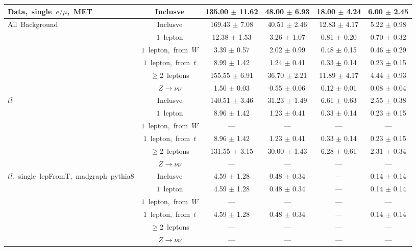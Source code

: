 \documentclass{article}
\begin{document}
\begin{longtable}{|l|c|c|c|c|c|}
\multirow{1}{*}{Data,~single~$e/\mu$,~MET} & Inclusve  & 135.00 $\pm$ 11.62  & 48.00 $\pm$ 6.93  & 18.00 $\pm$ 4.24  & 6.00 $\pm$ 2.45 \\* 
\hline \hline 
\multirow{6}{*}{All~Background} & Inclusve  & 169.43 $\pm$ 7.08  & 40.51 $\pm$ 2.46  & 12.83 $\pm$ 4.17  & 5.22 $\pm$ 0.98 \\* 
 & $1$~lepton  & 12.38 $\pm$ 1.53  & 3.26 $\pm$ 1.07  & 0.81 $\pm$ 0.20  & 0.70 $\pm$ 0.32 \\* 
 & $1$~lepton,~from~$W$  & 3.39 $\pm$ 0.57  & 2.02 $\pm$ 0.99  & 0.48 $\pm$ 0.15  & 0.46 $\pm$ 0.29 \\* 
 & $1$~lepton,~from~$t$  & 8.99 $\pm$ 1.42  & 1.24 $\pm$ 0.41  & 0.33 $\pm$ 0.14  & 0.23 $\pm$ 0.15 \\* 
 & $\ge2$~leptons  & 155.55 $\pm$ 6.91  & 36.70 $\pm$ 2.21  & 11.89 $\pm$ 4.17  & 4.44 $\pm$ 0.93 \\* 
 & $Z\rightarrow\nu\nu$  & 1.50 $\pm$ 0.03  & 0.55 $\pm$ 0.06  & 0.12 $\pm$ 0.01  & 0.08 $\pm$ 0.04 \\* 
\hline 
\multirow{6}{*}{$t\bar{t}$} & Inclusve  & 140.51 $\pm$ 3.46  & 31.23 $\pm$ 1.49  & 6.61 $\pm$ 0.63  & 2.55 $\pm$ 0.38 \\* 
 & $1$~lepton  & 8.96 $\pm$ 1.42  & 1.23 $\pm$ 0.41  & 0.33 $\pm$ 0.14  & 0.23 $\pm$ 0.15 \\* 
 & $1$~lepton,~from~$W$  & ---  & ---  & ---  & --- \\* 
 & $1$~lepton,~from~$t$  & 8.96 $\pm$ 1.42  & 1.23 $\pm$ 0.41  & 0.33 $\pm$ 0.14  & 0.23 $\pm$ 0.15 \\* 
 & $\ge2$~leptons  & 131.55 $\pm$ 3.15  & 30.00 $\pm$ 1.43  & 6.28 $\pm$ 0.61  & 2.31 $\pm$ 0.34 \\* 
 & $Z\rightarrow\nu\nu$  & ---  & ---  & ---  & --- \\* 
\hline 
\multirow{6}{*}{$t\bar{t}$,~single~lepFromT,~madgraph~pythia8} & Inclusve  & 4.59 $\pm$ 1.28  & 0.48 $\pm$ 0.34  & ---  & 0.14 $\pm$ 0.14 \\* 
 & $1$~lepton  & 4.59 $\pm$ 1.28  & 0.48 $\pm$ 0.34  & ---  & 0.14 $\pm$ 0.14 \\* 
 & $1$~lepton,~from~$W$  & ---  & ---  & ---  & --- \\* 
 & $1$~lepton,~from~$t$  & 4.59 $\pm$ 1.28  & 0.48 $\pm$ 0.34  & ---  & 0.14 $\pm$ 0.14 \\* 
 & $\ge2$~leptons  & ---  & ---  & ---  & --- \\* 
 & $Z\rightarrow\nu\nu$  & ---  & ---  & ---  & --- \\* 
\hline 

\end{longtable}
\end{document}
